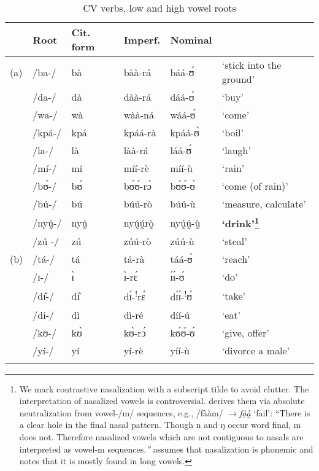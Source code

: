 \documentclass[output=paper
,newtxmath
,modfonts
,nonflat]{langsci/langscibook}
\begin{document}
\begin{table}
\begin{tabularx}{\textwidth}{lllllX}
\lsptoprule
& {Root} & {Cit. form} & {Imperf.} & {Nominal} & \\
\midrule
(a) & /ba-/ & bà & bàà-rá & báá-ʊ́ & ‘stick into the ground’\\
& /da-/ & dà & dàà-rá & dáá-ʊ́ & ‘buy’\\
& /wa-/ & wà & wàà-ná & wáá-ʊ́ & ‘come’\\
& /kpá-/ & kpá  & kpáá-rà  & kpáá-ʊ̀  & ‘boil’\\
& /la-/ & là  & làà-rá  & láá-ʊ́  & ‘laugh’\\
& /mí-/ & mí  & míí-rè	& míí-ù  & ‘rain’\\
& /bʊ́-/ & bʊ́ & bʊ́ʊ́-rɔ̀ &	bʊ́ʊ́-ʊ̀ & ‘come (of rain)’\\
& /bú-/ & bú & búú-rò	&	búú-ù	 & ‘measure, calculate’\\
& /nyṵ́-/ & nyṵ́ & nyṵ́ṵ́rò̰ &	nyṵ́ṵ́-ṵ̀ & \bfseries {‘drink’}\footnote{We mark contrastive nasalization with a subscript tilde to avoid clutter. The interpretation of nasalized vowels is controversial. \citet[12]{Kennedy1966} derives them via absolute neutralization from vowel-/m/ sequences, e.g., /fààm/ $\rightarrow$\textit{fà̰à}̰ ‘fail’: “There is a clear hole in the final nasal pattern. Though n and ŋ occur word final, m does not. Therefore nasalized vowels which are not contiguous to nasals are interpreted as vowel-m sequences.\textit{”} \citet[9]{Bodomo1997} assumes that nasalization is phonemic and notes that it is mostly found in long vowels.}\\
& /zú{} -/ & z\'u{}  & zúú-rò &	zúú-ù & ‘steal’\\
(b) & /tá-/ & tá & tá-rà &	táá-ʊ̀ & ‘reach’\\
& /ɪ-/ & ɪ̀ & ɪ̀-rɛ́ &	ɪ́ɪ́-ʊ́ & ‘do’\\
& /dɪ̂-/ & dɪ̂ & dɪ́-\textsuperscript{!}rɛ́ & dɪ́ɪ́-\textsuperscript{!}ʊ́  & ‘take’\\
& /di-/ & dì & dì-ré & díí-ú & ‘eat’\\
& /kʊ-/ & kʊ̀ & kʊ̀-rɔ́ &	kʊ́ʊ́-ʊ́ & ‘give, offer’\\
& /yí-/ & yí{}  & yí-rè &	yíí-ù  & ‘divorce a male’\\
\lspbottomrule
\end{tabularx} 
\caption{CV verbs, low and high vowel roots}
\label{tab:anttila:6}
\end{table}
\end{document}
